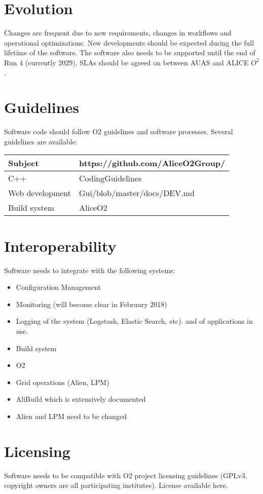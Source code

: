 \section{Evolution}
Changes are frequent due to new requirements, changes in workflows and operational optimizations. New developments should be expected during the full lifetime of the software. The software also needs to be supported until the end of Run 4 (currently 2029). SLAs should be agreed on between AUAS and ALICE $O^2$.

\section{Guidelines}
Software code should follow O2 guidelines and software processes. Several guidelines are available:
\begin{table}
\begin{tabular}{lp{7cm}}
  \hline
  Subject & https://github.com/AliceO2Group/\\
  \hline
  \hline
   C++ & CodingGuidelines\\
   \hline
   Web development & Gui/blob/master/docs/DEV.md\\
   \hline
   Build system & AliceO2\\
   \hline
\end{tabular}
\end{table}

\section{Interoperability}

Software needs to integrate with the following systems: 
\begin{itemize}
  \item Configuration Management
  \item Monitoring (will become clear in February 2018)
  \item Logging of the system (Logstash, Elastic Search, etc). and of applications in use.
  \item Build system
  \item O2 
  \item Grid operations (Alien, LPM) 
  \item AliBuild which is extensively documented
  \item Alien and LPM need to be changed
\end{itemize}


\section{Licensing}
Software needs to be compatible with O2 project licensing guidelines (GPLv3, copyright owners are all participating institutes). 
License available here. 

